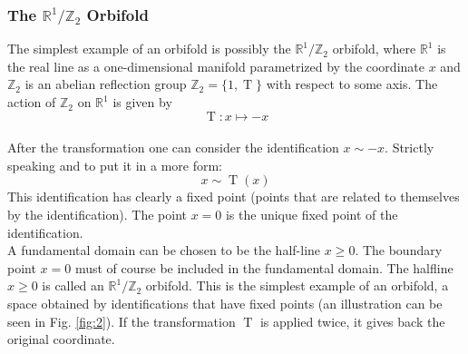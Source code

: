 \documentclass[11pt, xcolor=dvipsnames,aspectratio=169]{beamer}
\begin{document}
\begin{frame}
\frametitle{The \(\mathbb{R}^{1}/ \mathbb{Z}_{2}\) Orbifold}
The simplest example of an orbifold is possibly the \alert{\(\mathbb{R}^{1}/\mathbb{Z}_{2}\)} orbifold, where \(\mathbb{R}^{1}\) is the real line as a one-dimensional manifold parametrized by the coordinate \(x\) and \(\mathbb{Z}_{2}\) is an abelian reflection group \(\mathbb{Z}_{2}=\{1,\operatorname{T}\}\) with respect to some axis. The action of \(\mathbb{Z}_{2}\) on \(\mathbb{R}^{1}\) is given by \\
\begin{equation}
	\operatorname{T}: x \mapsto -x 
\end{equation}\\
 After the transformation one can  consider the identification \(x\sim-x\). Strictly speaking and to put it in a more  form:
 \begin{equation}
 	x\sim \operatorname{T}(x)
 \end{equation}
  This identification has clearly a fixed point (points that are related to themselves by the identification). The point \(x = 0\) is the unique fixed point of the identification.\\ A fundamental domain can be chosen to be the half-line \(x \geq 0\). The boundary point \(x = 0\) must of course be included in the fundamental domain. The halfline \(x \geq 0\) is called an \(\mathbb{R}^{1}/\mathbb{Z}_{2}\) orbifold. This is the simplest example of an orbifold, a space obtained by identifications that have fixed points (an illustration can be seen in Fig. \ref{fig:2}). If the transformation \(\operatorname{T}\) is applied twice, it gives back the original coordinate.\\\\

\begin{figure}[!h]
\end{figure}
\end{frame}
\end{document}
